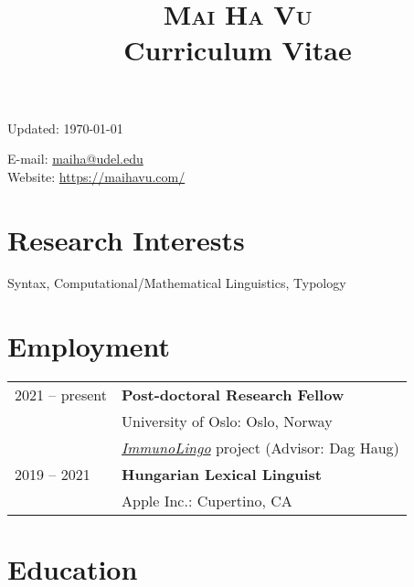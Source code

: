 \documentclass[11pt]{article} %
\title{\textsc{Mai Ha Vu} \\ {\large Curriculum Vitae}}
\date{}
\begin{document}
\maketitle 

\vskip -50pt
\begin{minipage}[ht]{0.65\textwidth}
Updated: \today \\
\end{minipage}
\begin{minipage}[ht]{0.60\textwidth}
\begin{flushleft}

E-mail: \href{mailto:maiha@udel.edu}{maiha@udel.edu} \\
Website: \href{https://maihavu.com/}{https://maihavu.com/}
\end{flushleft}
\end{minipage}

\section*{Research Interests}
Syntax, Computational/Mathematical Linguistics, Typology


\section*{Employment}

\begin{tabular}{p{1in} l}
	2021 -- present & \textbf{Post-doctoral Research Fellow} \\
	& University of Oslo: Oslo, Norway \\
	& \href{https://www.uio.no/english/research/strategic-research-areas/life-science/research/convergence-environments/immunolingo/}{\textit{ImmunoLingo}} project (Advisor: Dag Haug)\\
	2019 -- 2021 & \textbf{Hungarian Lexical Linguist} \\
	& Apple Inc.: Cupertino, CA \\[2pt]
\end{tabular}

\section*{Education}
\end{document}
